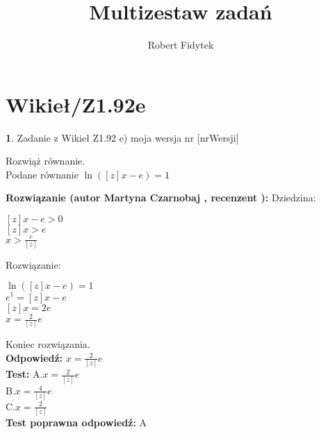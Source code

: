 \documentclass[12pt, a4paper]{article}
\title{Multizestaw zadań}
\author{Robert Fidytek}
\date{}
\theoremstyle{definition} %
\newtheorem{zad}{}
\newcommand{\kategoria}[1]{\section{#1}} %
\newcommand{\zadStart}[1]{\begin{zad}#1\newline} %
\newcommand{\zadStop}{\end{zad}}   %
\newcommand{\rozwStart}[2]{\noindent \textbf{Rozwiązanie (autor #1 , recenzent #2): }\newline} %
\newcommand{\rozwStop}{\newline}                                            %
\newcommand{\odpStart}{\noindent \textbf{Odpowiedź:}\newline}    %
\newcommand{\odpStop}{\newline}                                             %
\newcommand{\testStart}{\noindent \textbf{Test:}\newline} %
\newcommand{\testStop}{\newline} %
\newcommand{\kluczStart}{\noindent \textbf{Test poprawna odpowiedź:}\newline} %
\newcommand{\kluczStop}{\newline} %
\begin{document}
\maketitle


\kategoria{Wikieł/Z1.92e}
\zadStart{Zadanie z Wikieł Z1.92 e) moja wersja nr [nrWersji]}

Rozwiąż równanie.\\
Podane równanie $ \ln([z]x-e)=1 $\\
\zadStop
\rozwStart{Martyna Czarnobaj}{}
Dziedzina:
\begin{center}
	$ [z]x - e > 0 $ \\
	$ [z]x > e $\\
	$ x > \frac{e}{[z]} $\\ 
\end{center}
Rozwiązanie:
\begin{center}
	$ \ln ([z]x - e) = 1 $\\
	$ e^{1} = [z]x - e $\\
	$ [z]x = 2e $\\
	$ x = \frac{2}{[z]}e $\\
\end{center}
Koniec rozwiązania.\\
\rozwStop
\odpStart
$ x = \frac{2}{[z]}e $\\
\odpStop
\testStart
A.$ x = \frac{2}{[z]}e $\\
B.$ x = \frac{4}{[z]}e $\\
C.$ x = \frac{2}{[z]} $\\
\testStop
\kluczStart
A
\kluczStop
\end{document}
